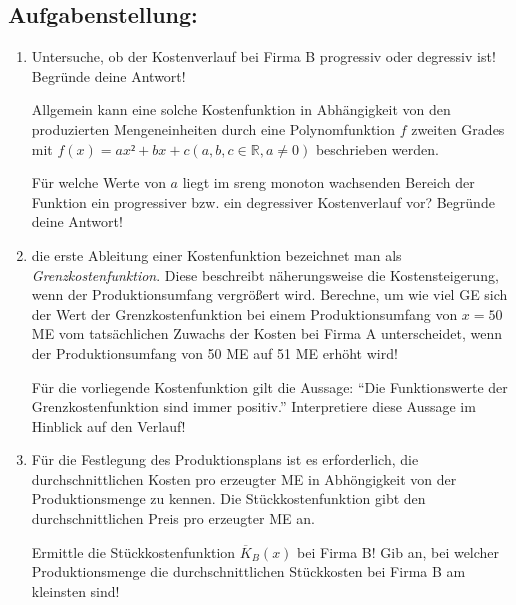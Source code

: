 \begin{langesbeispiel}
\subsection{Aufgabenstellung:}
\begin{enumerate}
	\item Untersuche, ob der Kostenverlauf bei Firma B progressiv oder degressiv ist! Begründe deine Antwort!
	
	Allgemein kann eine solche Kostenfunktion in Abhängigkeit von den produzierten Mengeneinheiten durch eine Polynomfunktion $f$ zweiten Grades mit $f(x)=ax²+bx+c (a,b,c\in\mathbb{R},a\neq 0)$ beschrieben werden.
	
	Für welche Werte von $a$ liegt im sreng monoton wachsenden Bereich der Funktion ein progressiver bzw. ein degressiver Kostenverlauf vor? Begründe deine Antwort!
	
	\item die erste Ableitung einer Kostenfunktion bezeichnet man als \textit{Grenzkostenfunktion}. Diese beschreibt näherungsweise die Kostensteigerung, wenn der Produktionsumfang vergrößert wird. Berechne, um wie viel GE sich der Wert der Grenzkostenfunktion bei einem Produktionsumfang von $x=50$ ME vom tatsächlichen Zuwachs der Kosten bei Firma A unterscheidet, wenn der Produktionsumfang von 50 ME auf 51 ME erhöht wird!
	
	Für die vorliegende Kostenfunktion gilt die Aussage: "`Die Funktionswerte der Grenzkostenfunktion sind immer positiv."' Interpretiere diese Aussage im Hinblick auf den Verlauf!
	
	\item Für die Festlegung des Produktionsplans ist es erforderlich, die durchschnittlichen Kosten pro erzeugter ME in Abhöngigkeit von der Produktionsmenge zu kennen. Die Stückkostenfunktion gibt den durchschnittlichen Preis pro erzeugter ME an.
	
	Ermittle die Stückkostenfunktion $\overline{K}_B(x)$ bei Firma B! Gib an, bei welcher Produktionsmenge die durchschnittlichen Stückkosten bei Firma B am kleinsten sind!
				\end{enumerate}\leer
				
				
\end{langesbeispiel}

